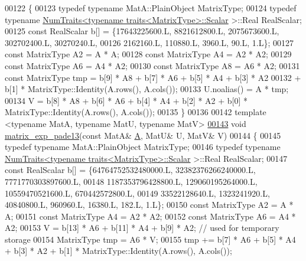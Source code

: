 \begin{DoxyCode}
00122 \{
00123   \textcolor{keyword}{typedef} \textcolor{keyword}{typename} MatA::PlainObject MatrixType;
00124   \textcolor{keyword}{typedef} \textcolor{keyword}{typename} \hyperlink{group___core___module_struct_eigen_1_1_num_traits}{NumTraits<typename traits<MatrixType>::Scalar}
      >::Real RealScalar;
00125   \textcolor{keyword}{const} RealScalar b[] = \{17643225600.L, 8821612800.L, 2075673600.L, 302702400.L, 30270240.L,
00126                           2162160.L, 110880.L, 3960.L, 90.L, 1.L\};
00127   \textcolor{keyword}{const} MatrixType A2 = A * A;
00128   \textcolor{keyword}{const} MatrixType A4 = A2 * A2;
00129   \textcolor{keyword}{const} MatrixType A6 = A4 * A2;
00130   \textcolor{keyword}{const} MatrixType A8 = A6 * A2;
00131   \textcolor{keyword}{const} MatrixType tmp = b[9] * A8 + b[7] * A6 + b[5] * A4 + b[3] * A2 
00132     + b[1] * MatrixType::Identity(A.rows(), A.cols());
00133   U.noalias() = A * tmp;
00134   V = b[8] * A8 + b[6] * A6 + b[4] * A4 + b[2] * A2 + b[0] * MatrixType::Identity(A.rows(), A.cols());
00135 \}
00136 
00142 \textcolor{keyword}{template} <\textcolor{keyword}{typename} MatA, \textcolor{keyword}{typename} MatU, \textcolor{keyword}{typename} MatV>
\hyperlink{namespace_eigen_1_1internal_ae7d0962a143c96343984440db683905a}{00143} \textcolor{keywordtype}{void} \hyperlink{namespace_eigen_1_1internal_ae7d0962a143c96343984440db683905a}{matrix\_exp\_pade13}(\textcolor{keyword}{const} MatA& \hyperlink{group___core___module_class_eigen_1_1_matrix}{A}, MatU& U, MatV& V)
00144 \{
00145   \textcolor{keyword}{typedef} \textcolor{keyword}{typename} MatA::PlainObject MatrixType;
00146   \textcolor{keyword}{typedef} \textcolor{keyword}{typename} \hyperlink{group___core___module_struct_eigen_1_1_num_traits}{NumTraits<typename traits<MatrixType>::Scalar}
      >::Real RealScalar;
00147   \textcolor{keyword}{const} RealScalar b[] = \{64764752532480000.L, 32382376266240000.L, 7771770303897600.L,
00148                           1187353796428800.L, 129060195264000.L, 10559470521600.L, 670442572800.L,
00149                           33522128640.L, 1323241920.L, 40840800.L, 960960.L, 16380.L, 182.L, 1.L\};
00150   \textcolor{keyword}{const} MatrixType A2 = A * A;
00151   \textcolor{keyword}{const} MatrixType A4 = A2 * A2;
00152   \textcolor{keyword}{const} MatrixType A6 = A4 * A2;
00153   V = b[13] * A6 + b[11] * A4 + b[9] * A2; \textcolor{comment}{// used for temporary storage}
00154   MatrixType tmp = A6 * V;
00155   tmp += b[7] * A6 + b[5] * A4 + b[3] * A2 + b[1] * MatrixType::Identity(A.rows(), A.cols());

\end{DoxyCode}
